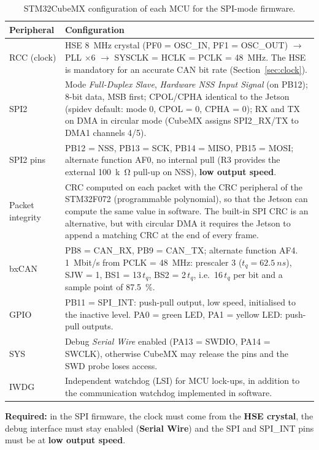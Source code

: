 \documentclass[11pt,a4paper]{article}
\newcommand{\required}[1]{\begin{reqbox}\textbf{\color{reqred}Required:} #1\end{reqbox}}
\begin{document}
\begin{table}[H]
\centering
\begin{tabular}{l>{\raggedright\arraybackslash}p{}}
\toprule
Peripheral & Configuration \\
\midrule
RCC (clock) & HSE \qty{8}{MHz} crystal (PF0 = OSC\_IN, PF1 = OSC\_OUT) $\to$ PLL $\times 6$ $\to$
SYSCLK = HCLK = PCLK = \qty{48}{MHz}. The HSE is mandatory for an
accurate CAN bit rate (Section~\ref{sec:clock}). \\
SPI2 & Mode \textit{Full-Duplex Slave}, \textit{Hardware NSS Input Signal} (on PB12); 8-bit data,
MSB first; CPOL/CPHA identical to the Jetson (spidev default: mode 0,
CPOL = 0, CPHA = 0); RX and TX on DMA in circular mode (CubeMX
assigns SPI2\_RX/TX to DMA1 channels 4/5). \\
SPI2 pins & PB12 = NSS, PB13 = SCK, PB14 = MISO, PB15 = MOSI; alternate
function AF0, no internal pull (R3 provides the external \qty{100}{k\ohm} pull-up on
NSS), \textbf{low output speed}. \\
Packet integrity & CRC computed on each packet with the CRC peripheral of the STM32F072
(programmable polynomial), so that the Jetson can compute the same value
in software. The built-in SPI CRC is an alternative, but with circular DMA
it requires the Jetson to append a matching CRC at the end of every frame. \\
bxCAN & PB8 = CAN\_RX, PB9 = CAN\_TX; alternate function AF4. \qty{1}{Mbit/s}
from PCLK = \qty{48}{MHz}: prescaler 3 ($t_q = \qty{62.5}{ns}$), SJW = 1, BS1 = 13\,$t_q$,
BS2 = 2\,$t_q$, i.e.\ 16\,$t_q$ per bit and a sample point of \qty{87.5}{\percent}. \\
GPIO & PB11 = SPI\_INT: push-pull output, low speed, initialised to the inactive
level. PA0 = green LED, PA1 = yellow LED: push-pull outputs. \\
SYS & Debug \textit{Serial Wire} enabled (PA13 = SWDIO, PA14 = SWCLK), otherwise
CubeMX may release the pins and the SWD probe loses access. \\
IWDG & Independent watchdog (LSI) for MCU lock-ups, in addition to the communication
watchdog implemented in software. \\
\bottomrule
\end{tabular}
\caption{STM32CubeMX configuration of each MCU for the SPI-mode firmware.}
\label{tab:cubemx}
\end{table}

\required{in the SPI firmware, the clock must come from the \textbf{HSE crystal}, the debug
interface must stay enabled (\textbf{Serial Wire}) and the SPI and SPI\_INT pins must be at \textbf{low
output speed}.}
\end{document}
